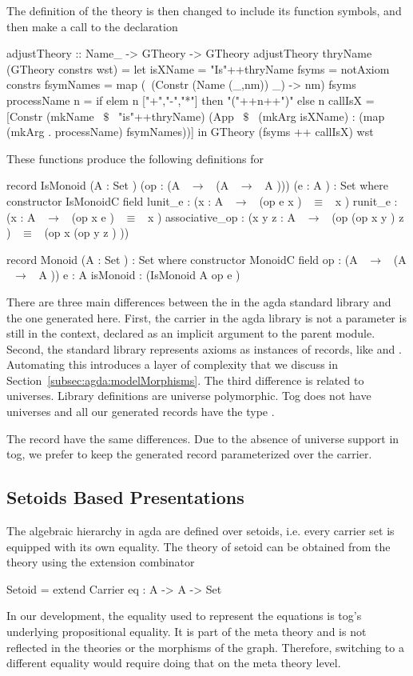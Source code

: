 The definition of the theory  is then changed to include its function symbols, and then make a call to the  declaration 
\begin{hscode}
adjustTheory :: Name_ -> GTheory -> GTheory
adjustTheory thryName (GTheory constrs wst) =
  let isXName = "Is"++thryName
      fsyms = notAxiom constrs
      fsymNames = map (\ (Constr (Name (_,nm)) _) -> nm) fsyms
      processName n = if elem n ["+","-","*"] then "("++n++")" else n 
      callIsX = [Constr (mkName ~$\$$~ "is"++thryName)
                     (App ~$\$$~ (mkArg isXName) 
                          : (map (mkArg . processName) fsymNames))]
  in GTheory (fsyms ++ callIsX) wst 
\end{hscode} 
These functions produce the following definitions for 
\begin{agdacode}
record IsMonoid (A  : Set ) (op  : (A  ~$\to$~ (A ~$\to$~ A ))) (e  : A )  : Set where
  constructor IsMonoidC
  field
   lunit_e : ({x  : A }  ~$\to$~ (op e x ) ~$\equiv$~ x )
   runit_e : ({x  : A }  ~$\to$~ (op x e ) ~$\equiv$~ x )
   associative_op : ({x y z  : A }  ~$\to$~ (op (op x y ) z ) ~$\equiv$~ (op x (op y z ) )) 

record Monoid (A  : Set )  : Set where
  constructor MonoidC
  field
   op : (A  ~$\to$~ (A  ~$\to$~ A ))
   e : A 
   isMonoid : (IsMonoid A op e ) 
\end{agdacode}
There are three main differences between the  in the agda standard library and the one generated here. First, the carrier in the agda library is not a parameter is still in the context, declared as an implicit argument to the parent module. 
Second, the standard library represents axioms as instances of records, like  and . Automating this introduces a layer of complexity that we discuss in Section~\ref{subsec:agda:modelMorphisms}. The third difference is related to universes. Library definitions are universe polymorphic. Tog does not have universes and all our generated records have the type . 

The record  have the same differences. Due to the absence of universe support in tog, we prefer to keep the generated  record parameterized over the carrier. 

\subsection{Setoids Based Presentations}
\label{subsec:setoid-based-pres}
The algebraic hierarchy in agda are defined over setoids, i.e. every carrier set is equipped with its own equality. 
The theory of setoid can be obtained from the  theory using the extension combinator 
\begin{togcode}
Setoid = extend Carrier {eq : A -> A -> Set}
\end{togcode}
In our development, the equality used to represent the equations is tog's underlying propositional equality. It is part of the meta theory and is not reflected in the theories or the morphisms of the graph. Therefore, switching to a different equality would require doing that on the meta theory level. 

